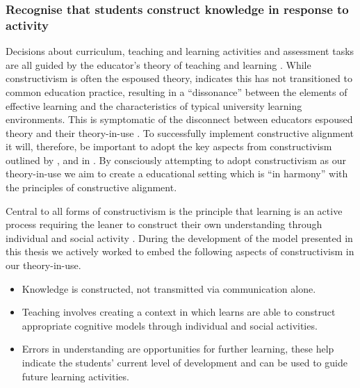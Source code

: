 \subsubsection{Recognise that students construct knowledge in response to activity} %
\label{ssub:ideas_adopted_from_constructivism}

Decisions about curriculum, teaching and learning activities and assessment tasks are all guided by the educator's theory of teaching and learning \cite{Argyris:1976,Ramsden:1992}. While constructivism is often the espoused theory, \citet{Phillips:2005} indicates this has not transitioned to common education practice, resulting in a ``dissonance'' between the elements of effective learning and the characteristics of typical university learning environments. This is symptomatic of the disconnect between educators espoused theory and their theory-in-use \cite{Argyris:1976}. To successfully implement constructive alignment it will, therefore, be important to adopt the key aspects from constructivism outlined by \citet{Biggs:1996c}, \citet{Biggs:1997} and in \citet{Biggs:2007}. By consciously attempting to adopt constructivism as our theory-in-use we aim to create a educational setting which is ``in harmony'' with the principles of constructive alignment.

Central to all forms of constructivism is the principle that learning is an active process requiring the leaner to construct their own understanding through individual and social activity \cite{Biggs:1996c,Cunningham:1996,Duffy:1992,Glasersfeld:1989,Steffe:1995}. During the development of the model presented in this thesis we actively worked to embed the following aspects of constructivism in our theory-in-use.

\begin{itemize}
	\item Knowledge is constructed, not transmitted via communication alone.
	\item Teaching involves creating a context in which learns are able to construct appropriate cognitive models through individual and social activities.
	\item Errors in understanding are opportunities for further learning, these help indicate the students' current level of development and can be used to guide future learning activities.
\end{itemize}

